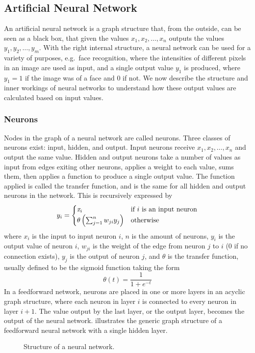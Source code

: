 \subsection{Artificial Neural Network}
An artificial neural network is a graph structure that, from the outside, can be seen as a black box, that given the values $x_1, x_2, \dots, x_n$ outputs the values $y_1, y_2, \dots, y_m$. With the right internal structure, a neural network can be used for a variety of purposes, e.g.\ face recognition, where the intensities of different pixels in an image are used as input, and a single output value $y_1$ is produced, where $y_1 = 1$ if the image was of a face and $0$ if not. We now describe the structure and inner workings of neural networks to understand how these output values are calculated based on input values.

\subsubsection{Neurons}
Nodes in the graph of a neural network are called neurons. Three classes of neurons exist: input, hidden, and output. Input neurons receive $x_1, x_2, \dots, x_n$ and output the same value. Hidden and output neurons take a number of values as input from edges exiting other neurons, applies a weight to each value, sums them, then applies a function to produce a single output value. The function applied is called the transfer function, and is the same for all hidden and output neurons in the network. This is recursively expressed by 
\begin{equation*}\label{eq:weightcalc}
  y_i =
  \begin{cases}
    \var{x}_i                     & \text{if } i \text{ is an input neuron} \\
    \theta\left(\sum_{j=1}^n w_{ji} y_{j} \right) & \text{otherwise} %
  \end{cases}
\end{equation*}
%
where $x_i$ is the input to input neuron $i$, $n$ is the amount of neurons, $y_i$ is the output value of neuron $i$, $w_{ji}$ is the weight of the edge from neuron $j$ to $i$ ($0$ if no connection exists), $y_j$ is the output of neuron $j$, and $\theta$ is the transfer function, usually defined to be the sigmoid function taking the form
%
\begin{equation*}
  \theta(t) = \frac{1}{1+e^{-t}}
\end{equation*}
%
In a feedforward network, neurons are placed in one or more layers in an acyclic graph structure, where each neuron in layer $i$ is connected to every neuron in layer $i + 1$. The value output by the last layer, or the output layer, becomes the output of the neural network.  illustrates the generic graph structure of a feedforward neural network with a single hidden layer.
%
\begin{figure}[htpb]
  \centering
  
  \caption{Structure of a neural network.}
  \label{fig:ann}
\end{figure}
%
